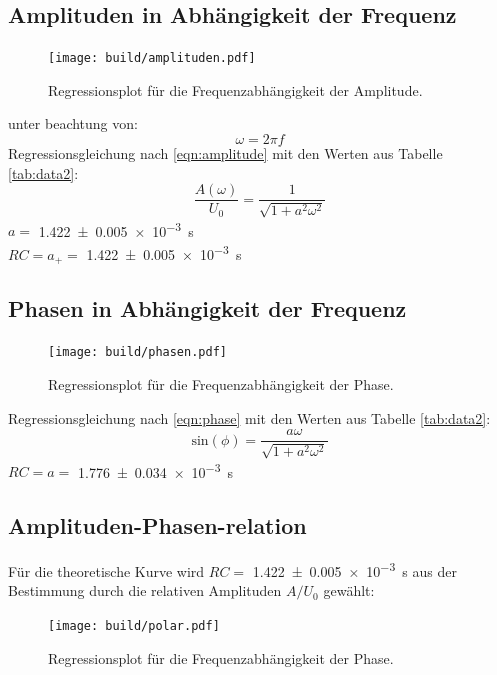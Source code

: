 \subsection{Amplituden in Abhängigkeit der Frequenz}

\begin{figure}[H]
  \centering
  \texttt{[image: build/amplituden.pdf]}
  \caption{Regressionsplot für die Frequenzabhängigkeit der Amplitude.}
  \label{fig:amp_plot}
\end{figure}
unter beachtung von:
\begin{equation}
  \omega = 2\pi f
\end{equation}
Regressionsgleichung nach \eqref{eqn:amplitude}
mit den Werten aus Tabelle \ref{tab:data2}:
\begin{equation}
  \frac{A(\omega)}{U_0}=\frac{1}{\sqrt{1+a^2\omega^2}}
\end{equation}
$a=$ \pm\SI{1.422(5)e-3}{\second}\\
$RC=a_+=$ \SI{1.422(5)e-3}{\second}

\subsection{Phasen in Abhängigkeit der Frequenz}

\begin{figure}[H]
  \centering
  \texttt{[image: build/phasen.pdf]}
  \caption{Regressionsplot für die Frequenzabhängigkeit der Phase.}
  \label{fig:ph_plot}
\end{figure}

Regressionsgleichung nach \eqref{eqn:phase}
mit den Werten aus Tabelle \ref{tab:data2}:
\begin{equation}
  \text{sin}(\phi)=\frac{a\omega}{\sqrt{1+a^2\omega^2}}
\end{equation}
$RC=a=$ \SI{1.776(34)e-3}{\second}\\

\subsection{Amplituden-Phasen-relation}
Für die theoretische Kurve wird $RC=$ \SI{1.422(5)e-3}{\second} aus der Bestimmung durch die relativen
Amplituden $A/U_0$ gewählt:
\begin{figure}[H]
  \centering
  \texttt{[image: build/polar.pdf]}
  \caption{Regressionsplot für die Frequenzabhängigkeit der Phase.}
  \label{fig:pol_plot}
\end{figure}


